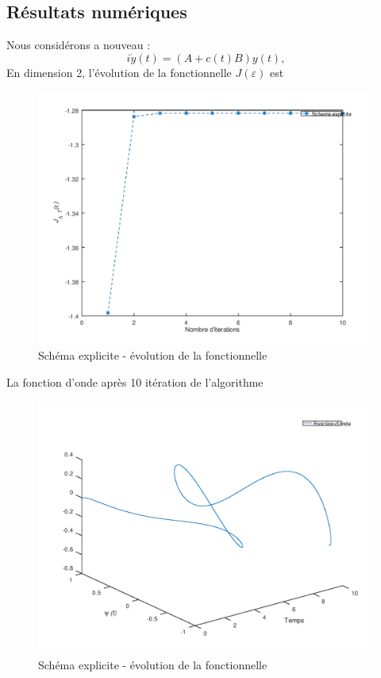 \subsection{Résultats numériques}
Nous considérons a nouveau :
\begin{equation}
i\dot y(t)= (A+c(t)B)y(t),
\end{equation}
En dimension 2, l'évolution de la fonctionnelle $J(\varepsilon)$ est
\begin{figure}[H]
	\caption{Schéma explicite - évolution de la fonctionnelle}
	\centering
	\includegraphics[scale=0.7]{images/explicit_func.png}
\end{figure}
La fonction d'onde après 10 itération de l'algorithme
\begin{figure}[H]
	\caption{Schéma explicite - évolution de la fonctionnelle}
	\centering
	\includegraphics[scale=0.7]{images/explicit_state.png}
\end{figure}
